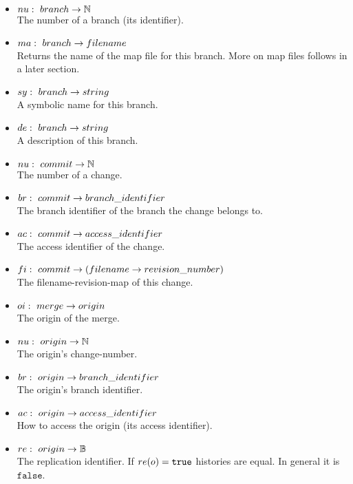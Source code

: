 \documentclass[fleqn, 10pt, a4paper]{report}
\begin{document}
\begin{itemize}
\item $\mathnormal{nu}:\ \mathnormal{branch} \rightarrow \mathbb{N}$ \\
The number of a branch (its identifier).
\item $\mathnormal{ma}:\ \mathnormal{branch} \rightarrow \mathnormal{filename}$ \\
Returns the name of the map file for this branch. More on map files follows in
a later section.
\item $\mathnormal{sy}:\ \mathnormal{branch} \rightarrow \mathnormal{string}$ \\
A symbolic name for this branch.
\item $\mathnormal{de}:\ \mathnormal{branch} \rightarrow \mathnormal{string}$ \\
A description of this branch.
\item $\mathnormal{nu}:\ \mathnormal{commit} \rightarrow \mathbb{N}$ \\
The number of a change.
\item $\mathnormal{br}:\ \mathnormal{commit} \rightarrow \mathnormal{branch\_identifier}$ \\
The branch identifier of the branch the change belongs to.
\item $\mathnormal{ac}:\ \mathnormal{commit} \rightarrow \mathnormal{access\_identifier}$ \\
The access identifier of the change.
\item $\mathnormal{fi}:\ \mathnormal{commit} \rightarrow (\mathnormal{filename}
\rightarrow \mathnormal{revision\_number})$ \\
The filename-revision-map of this change.
\item $\mathnormal{oi}:\ \mathnormal{merge} \rightarrow \mathnormal{origin}$ \\
The origin of the merge.
\item $\mathnormal{nu}:\ \mathnormal{origin} \rightarrow \mathbb{N}$ \\
The origin's change-number.
\item $\mathnormal{br}:\ \mathnormal{origin} \rightarrow \mathnormal{branch\_identifier}$ \\
The origin's branch identifier.
\item $\mathnormal{ac}:\ \mathnormal{origin} \rightarrow \mathnormal{access\_identifier}$ \\
How to access the origin (its access identifier).
\item $\mathnormal{re}:\ \mathnormal{origin} \rightarrow \mathbb{B}$ \\
The replication identifier. If $\mathnormal{re}(o) = \mathtt{true}$
histories are equal. In general it is $\mathtt{false}$.
\end{itemize}
\end{document}
